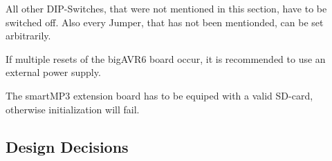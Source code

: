 \documentclass[12pt,a4paper,titlepage,oneside]{article}
\begin{document}
\noindent
All other DIP-Switches, that were not mentioned in this section, have to be switched off.
Also every Jumper, that has not been mentionded, can be set arbitrarily. 

\noindent
If multiple resets of the bigAVR6 board occur, it is recommended to use an
external power supply.

\noindent
The smartMP3 extension board has to be equiped with a valid SD-card, otherwise initialization
will fail.

\subsection{Design Decisions}
\end{document}
